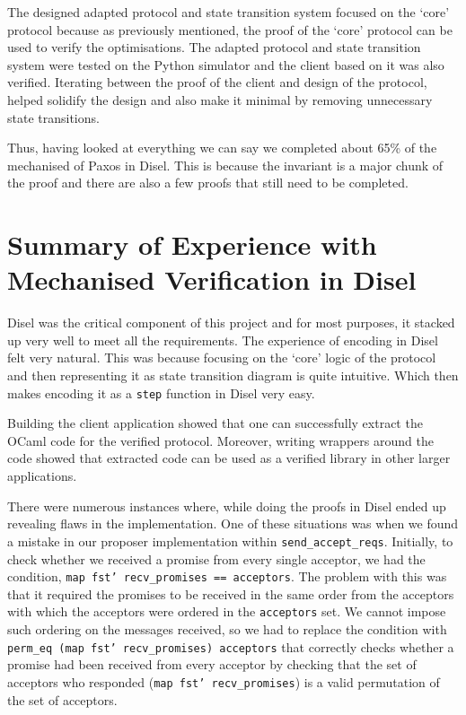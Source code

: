 The designed adapted protocol and state transition system focused on
the `core' protocol because as previously mentioned, the proof of the `core'
protocol can be used to verify the optimisations. The adapted protocol and
state transition system were tested on the Python simulator and the client
based on it was also verified. Iterating between the proof of the client
and design of the protocol, helped solidify the design and also make it
minimal by removing unnecessary state transitions.

Thus, having looked at everything we can say we completed about 65\% of
the mechanised of Paxos in Disel. This is because the invariant is a major chunk of
the proof and there are also a few proofs that still need to be completed.

\section{Summary of Experience with Mechanised Verification in Disel}
Disel was the critical component of this project and for most purposes, it
stacked up very well to meet all the requirements.
The experience of encoding in Disel felt very natural. This was because
focusing on the `core' logic of the protocol and then representing it
as state transition diagram is quite intuitive. Which then makes
encoding it as a \texttt{step} function in Disel very easy.

Building the client application showed that one can successfully extract
the OCaml code for the verified protocol. Moreover, writing wrappers
around the code showed that extracted code can be used as a verified library
in other larger applications.

There were numerous instances where, while doing the proofs in Disel
ended up revealing flaws in the implementation. One of these situations was
when we found a mistake in our proposer implementation within
\texttt{send\_accept\_reqs}. Initially, to check
whether we received a promise from every single acceptor, we had the condition,
\texttt{map fst' recv\_promises == acceptors}. The problem with this was that
it required the promises to be received in the same order from the acceptors
with which the acceptors were ordered in the \texttt{acceptors} set. We cannot impose
such ordering on the messages received, so we had to replace the condition
with \texttt{perm\_eq (map fst' recv\_promises) acceptors} that correctly checks
whether a promise had been received from every acceptor by checking that
the set of acceptors who responded (\texttt{map fst' recv\_promises}) is
a valid permutation of the set of acceptors.

